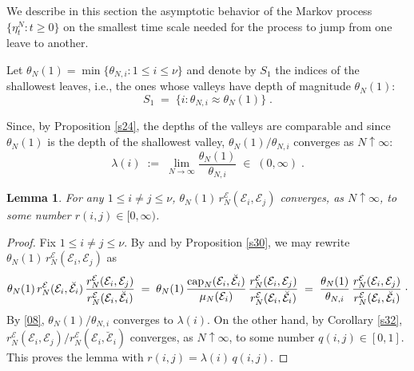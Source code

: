 \documentclass[reqno]{amsart}
\newtheorem{lemma}[theorem]{Lemma}
\begin{document}
We describe in this section the asymptotic behavior of the Markov
process $\{\eta^N_t : t\ge 0\}$ on the smallest time scale needed for
the process to jump from one leave to another.

Let $\theta_N(1) = \min \{\theta_{N,i} : 1\le i\le \nu\}$ and denote by
$S_1$ the indices of the shallowest leaves, i.e., the ones whose
valleys have depth of magnitude $\theta_N(1)$:
\begin{equation*}
S_1\;=\; \big\{ i : \theta_{N,i} \approx \theta_N (1) \big\}\; .
\end{equation*}

Since, by Proposition \ref{s24}, the depths of the valleys are
comparable and since $\theta_N(1)$ is the depth of the shallowest
valley, $\theta_N(1)/\theta_{N,i}$ converges as $N\uparrow\infty$:
\begin{equation}
\label{08}
\lambda (i) \;:=\; \lim_{N\to\infty} \frac{\theta_N(1)}{\theta_{N,i}} 
\;\in\; (0,\infty)\;.  
\end{equation}

\begin{lemma}
\label{s25}
For any $1\le i\not = j\le \nu$, $\theta_N(1) \, r^{{{\mathcal E}}}_N({{\mathcal E}}_i,
{{\mathcal E}}_j)$ converges, as $N\uparrow\infty$, to some number $r(i,j)\in
[0,\infty)$.
\end{lemma}

\begin{proof}
Fix $1\le i\not = j\le \nu$.  By \cite[Lemma 6.7]{bl2} and by
Proposition \ref{s30}, we may rewrite $\theta_N(1) \, r^{{{\mathcal E}}}_N({{\mathcal E}}_i, {{\mathcal E}}_j)$ as
\begin{equation*}
\theta_N(1) \, r^{{{\mathcal E}}}_N({{\mathcal E}}_i, \breve{{{\mathcal E}}}_i)  \,
\frac{r^{{{\mathcal E}}}_N({{\mathcal E}}_i, {{\mathcal E}}_j)}
{r^{{{\mathcal E}}}_N({{\mathcal E}}_i, \breve{{{\mathcal E}}}_i)} \;=\;
\theta_N(1) \, \frac{{{\rm cap}}_N ({{\mathcal E}}_i, \breve{{{\mathcal E}}}_i)}
{\mu_N({{\mathcal E}}_i)}\, \frac{r^{{{\mathcal E}}}_N({{\mathcal E}}_i, {{\mathcal E}}_j)}
{r^{{{\mathcal E}}}_N({{\mathcal E}}_i, \breve{{{\mathcal E}}}_i)} 
\;=\; \frac{\theta_N(1)} {\theta_{N,i}}\, 
\frac{r^{{{\mathcal E}}}_N({{\mathcal E}}_i, {{\mathcal E}}_j)}
{r^{{{\mathcal E}}}_N({{\mathcal E}}_i, \breve{{{\mathcal E}}}_i)}\;\cdot
\end{equation*}
By \eqref{08}, $\theta_N(1)/\theta_{N,i}$ converges to $\lambda(i)$.
On the other hand, by Corollary \ref{s32}, $r^{{{\mathcal E}}}_N({{\mathcal E}}_i, {{\mathcal E}}_j)/r^{{{\mathcal E}}}_N({{\mathcal E}}_i, \breve{{{\mathcal E}}}_i)$ converges, as
$N\uparrow\infty$, to some number $q(i,j)\in [0,1]$. This proves the
lemma with $r(i,j) = \lambda(i)\, q(i,j)$.
\end{proof}
\end{document}

